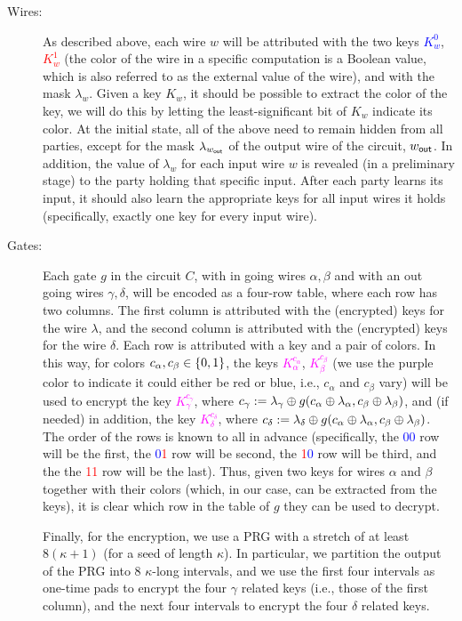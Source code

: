 \begin{description}
\item[Wires:] As described above, each wire $w$ will be attributed with the two keys \textcolor{blue}{$K^{0}_w$}, \textcolor{red}{$K^{1}_w$} (the color of the wire in a specific computation is a Boolean value, which is also referred to as the external value of the wire), and with the mask $\lambda_w$. Given a key $K_w$, it should be possible to extract the color of the key, we will do this by letting the least-significant bit of $K_w$ indicate its color. At the initial state, all of the above need to remain hidden from all parties, except for the mask $\lambda_{w_{\mathsf{out}}}$ of the output wire of the circuit, ${w_{\mathsf{out}}}$. In addition, the value of $\lambda_w$ for each input wire $w$ is revealed (in a preliminary stage) to the party holding that specific input. After each party learns its input, it should also learn the appropriate keys for all input wires it holds (specifically, exactly one key for every input wire).

\item[Gates:] 
Each gate $g$ in the circuit $C$, with in going wires $\alpha, \beta$ and with an out going wires $\gamma, \delta$,  will be encoded as a four-row table, where each row has two columns. The first column is attributed with the (encrypted) keys for the wire $\lambda$, and the second column is attributed with the (encrypted) keys for the wire $\delta$.  Each row is attributed with a key and a pair of colors. In this way, for colors $c_\alpha, c_\beta \in \{0,1\}$, the keys \textcolor{magenta}{$K^{c_\alpha}_\alpha$}, \textcolor{magenta}{$K^{c_\beta}_\beta$} (we use the purple color to indicate it could either be red or blue, i.e., $c_\alpha$ and $c_\beta$ vary) will be used to encrypt the key \textcolor{magenta}{$K_\gamma^{c_\gamma}$}, where $c_\gamma := \lambda_\gamma\oplus g(c_\alpha\oplus\lambda_\alpha, c_\beta\oplus\lambda_\beta)$, and (if needed) in addition, the key \textcolor{magenta}{$K_\delta^{c_\delta}$}, where $c_\delta := \lambda_\delta\oplus g(c_\alpha\oplus\lambda_\alpha, c_\beta\oplus\lambda_\beta)$. The order of the rows is known to all in advance (specifically, the \textcolor{blue}{00} row will be the first, the \textcolor{blue}{0}\textcolor{red}{1} row will be second, the \textcolor{red}{1}\textcolor{blue}{0} row will be third, and the the \textcolor{red}{11} row will be the last). Thus, given two keys for wires $\alpha$ and $\beta$ together with their colors (which, in our case, can be extracted from the keys), it is clear which row in the table of $g$ they can be used to decrypt. 

Finally, for the encryption, we use a PRG with a stretch of at least $8(\kappa+1)$ (for a seed of length $\kappa$). In particular, we partition the output of the PRG into 8 $\kappa$-long intervals, and we use the first four intervals as one-time pads to encrypt the four $\gamma$ related keys (i.e., those of the first column), and the next four intervals to encrypt the four $\delta$ related keys.

\end{description}
